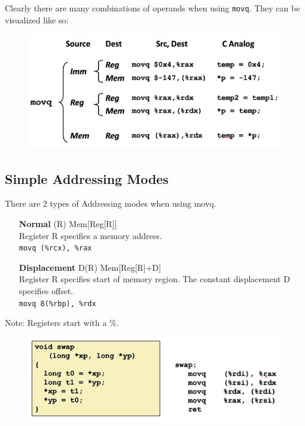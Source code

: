 \documentclass[12pt]{book}
\begin{document}
Clearly there are many combinations of operands when using \texttt{movq}. They can be visualized like so:
\begin{figure}[h]
        \centering
        \includegraphics[scale = 0.7]{./figures/movqOperations}
\end{figure}

\subsection*{Simple Addressing Modes}
There are 2 types of Addressing modes when using movq.
\begin{itemize}
        \item[\textbf{Normal}] (R) Mem[Reg[R]]\\
                Register R specifies a memory address.\\
                \texttt{movq (\%rcx), \%rax}
        \item[\textbf{Displacement}] D(R) Mem[Reg[R]+D]\\
                Register R specifies start of memory region. The constant displacement D specifies offset.\\
                \texttt{movq 8(\%rbp), \%rdx}
\end{itemize}
Note: Registers start with a \%.
\begin{figure}
        \centering
        \includegraphics[scale = 0.6]{./figures/addressex1}
        
\end{figure}
\end{document}
